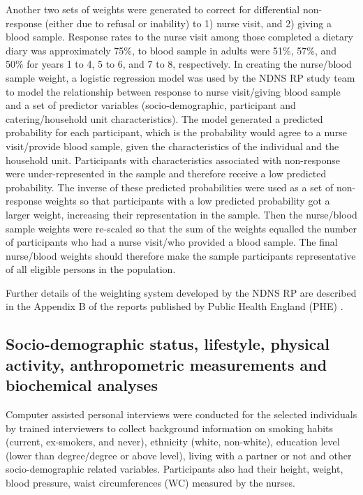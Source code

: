 Another two sets of weights were generated to correct for differential non-response (either due to refusal or inability) to 1) nurse visit, and 2) giving a blood sample. Response rates to the nurse visit among those completed a dietary diary was approximately 75\%, to blood sample in adults were 51\%, 57\%, and 50\% for years 1 to 4, 5 to 6, and 7 to 8, respectively. In creating the nurse/blood sample weight, a logistic regression model was used by the NDNS RP study team to model the relationship between response to nurse visit/giving blood sample and a set of predictor variables (socio-demographic, participant and catering/household unit characteristics). The model generated a predicted probability for each participant, which is the probability would agree to a nurse visit/provide blood sample, given the characteristics of the individual and the household unit. Participants with characteristics associated with non-response were under-represented in the sample and therefore receive a low predicted probability. The inverse of these predicted probabilities were used as a set of non-response weights so that participants with a low predicted probability got a larger weight, increasing their representation in the sample. Then the nurse/blood sample weights were re-scaled so that the sum of the weights equalled the number of participants who had a nurse visit/who provided a blood sample. The final nurse/blood weights should therefore make the sample participants representative of all eligible persons in the population. 

Further details of the weighting system developed by the NDNS RP are described in the Appendix B of the reports published by Public Health England (PHE) \parencite{bates2014national,roberts2018national,NDNSofficial}.\vspace{-0.6cm}

\subsection{Socio-demographic status, lifestyle, physical activity, anthropometric measurements and biochemical analyses}\vspace{-0.3cm}

Computer assisted personal interviews were conducted for the selected individuals by trained interviewers to collect background information on smoking habits (current, ex-smokers, and never), ethnicity (white, non-white), education level (lower than degree/degree or above level), living with a partner or not and other socio-demographic related variables. Participants also had their height, weight, blood pressure, waist circumferences (WC) measured by the nurses. 

